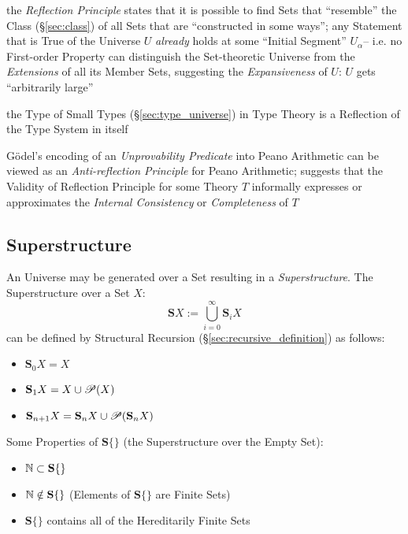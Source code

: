 the \emph{Reflection Principle} states that it is possible to find
Sets that ``resemble'' the Class (\S\ref{sec:class}) of all Sets that
are ``constructed in some ways''; any Statement that is True of the
Universe $U$ \emph{already} holds at some ``Initial Segment''
$U_\alpha$-- i.e. no First-order Property can distinguish the
Set-theoretic Universe from the \emph{Extensions} of all its Member
Sets, suggesting the \emph{Expansiveness} of $U$: $U$ gets
``arbitrarily large''


the Type of Small Types (\S\ref{sec:type_universe}) in Type Theory is
a Reflection of the Type System in itself

G\"odel's encoding of an \emph{Unprovability Predicate} into Peano
Arithmetic can be viewed as an \emph{Anti-reflection Principle} for
Peano Arithmetic; suggests that the Validity of Reflection Principle
for some Theory $T$ informally expresses or approximates the
\emph{Internal Consistency} or \emph{Completeness} of $T$



\subsection{Superstructure}\label{sec:superstructure}

An Universe may be generated over a Set resulting in a
\emph{Superstructure}. The Superstructure over a Set $X$:
\[
  \mathbf{S}X := \bigcup^{\infty}_{i=0}\mathbf{S}_i X
\]
can be defined by Structural Recursion
(\S\ref{sec:recursive_definition}) as follows:
\begin{itemize}

\item $\mathbf{S}_0 X = X$
\item $\mathbf{S}_1 X = X \cup \mathscr{P}(X)$
\item $\mathbf{S}_{n+1} X =
  \mathbf{S}_n X \cup \mathscr{P}(\mathbf{S}_n X)$

\end{itemize}
Some Properties of $\mathbf{S}\{\}$ (the Superstructure over the Empty
Set):
\begin{itemize}

\item $\mathbb{N} \subset \mathbf{S}\{\}$
\item $\mathbb{N} \notin \mathbf{S}\{\}$ (Elements of $\mathbf{S}\{\}$
  are Finite Sets)
\item $\mathbf{S}\{\}$ contains all of the Hereditarily Finite Sets

\end{itemize}

